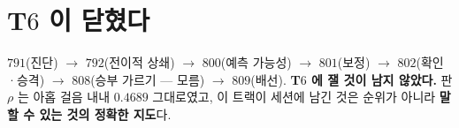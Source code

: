 \documentclass[10pt,a4paper]{article}
\begin{document}
\section{T$6$ 이 닫혔다}

$791$(진단) $\to$ $792$(전이적 상쇄) $\to$ $800$(예측 가능성) $\to$ $801$(보정)
$\to$ $802$(확인·승격) $\to$ $808$(승부 가르기 --- 모름) $\to$ $809$(배선).
\textbf{T$6$ 에 잴 것이 남지 않았다.} 판 $\rho$ 는 아홉 걸음 내내 $0.4689$
그대로였고, 이 트랙이 세션에 남긴 것은 순위가 아니라 \textbf{말할 수 있는 것의
정확한 지도}다.
\end{document}
